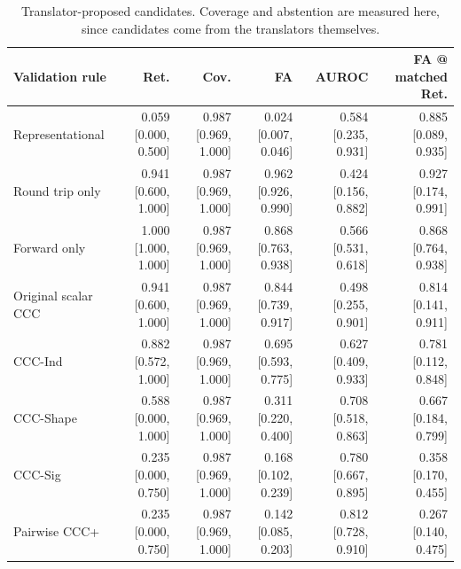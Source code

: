 \begin{table}[t]
\centering
\small
\begin{tabular}{lrrrrr}
\toprule
Validation rule & Ret. & Cov. & FA & AUROC & FA @ matched Ret. \\
\midrule
Representational & 0.059 [0.000, 0.500] & 0.987 [0.969, 1.000] & 0.024 [0.007, 0.046] & 0.584 [0.235, 0.931] & 0.885 [0.089, 0.935] \\
Round trip only & 0.941 [0.600, 1.000] & 0.987 [0.969, 1.000] & 0.962 [0.926, 0.990] & 0.424 [0.156, 0.882] & 0.927 [0.174, 0.991] \\
Forward only & 1.000 [1.000, 1.000] & 0.987 [0.969, 1.000] & 0.868 [0.763, 0.938] & 0.566 [0.531, 0.618] & 0.868 [0.764, 0.938] \\
Original scalar CCC & 0.941 [0.600, 1.000] & 0.987 [0.969, 1.000] & 0.844 [0.739, 0.917] & 0.498 [0.255, 0.901] & 0.814 [0.141, 0.911] \\
CCC-Ind & 0.882 [0.572, 1.000] & 0.987 [0.969, 1.000] & 0.695 [0.593, 0.775] & 0.627 [0.409, 0.933] & 0.781 [0.112, 0.848] \\
CCC-Shape & 0.588 [0.000, 1.000] & 0.987 [0.969, 1.000] & 0.311 [0.220, 0.400] & 0.708 [0.518, 0.863] & 0.667 [0.184, 0.799] \\
CCC-Sig & 0.235 [0.000, 0.750] & 0.987 [0.969, 1.000] & 0.168 [0.102, 0.239] & 0.780 [0.667, 0.895] & 0.358 [0.170, 0.455] \\
Pairwise CCC+ & 0.235 [0.000, 0.750] & 0.987 [0.969, 1.000] & 0.142 [0.085, 0.203] & 0.812 [0.728, 0.910] & 0.267 [0.140, 0.475] \\
\bottomrule
\end{tabular}
\caption{Translator-proposed candidates. Coverage and abstention are measured here, since candidates come from the translators themselves.}
\label{tab:part_b_translator_rules}
\end{table}